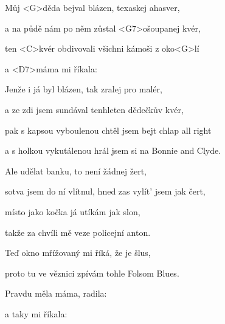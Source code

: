

\zs
Můj <G>děda bejval blázen, texaskej ahasver,

a na půdě nám po něm zůstal <G7>ošoupanej kvér,

ten <C>kvér obdivovali všichni kámoši z oko<G>lí

a <D7>máma mi říkala: 
\ks

\zs
Jenže i já byl blázen, tak zralej pro malér,

a ze zdi jsem sundával tenhleten dědečkův kvér,

pak s kapsou vyboulenou chtěl jsem bejt chlap all right

a s holkou vykutálenou hrál jsem si na Bonnie and Clyde.
\ks

\zs
Ale udělat banku, to není žádnej žert,

sotva jsem do ní vlítnul, hned zas vylít' jsem jak čert,

místo jako kočka já utíkám jak slon,

takže za chvíli mě veze policejní anton.

\ks

\zs
Teď okno mřížovaný mi říká, že je šlus,

proto tu ve věznici zpívám tohle Folsom Blues.

Pravdu měla máma, radila: 

a taky mi říkala: 
\ks

\kp
